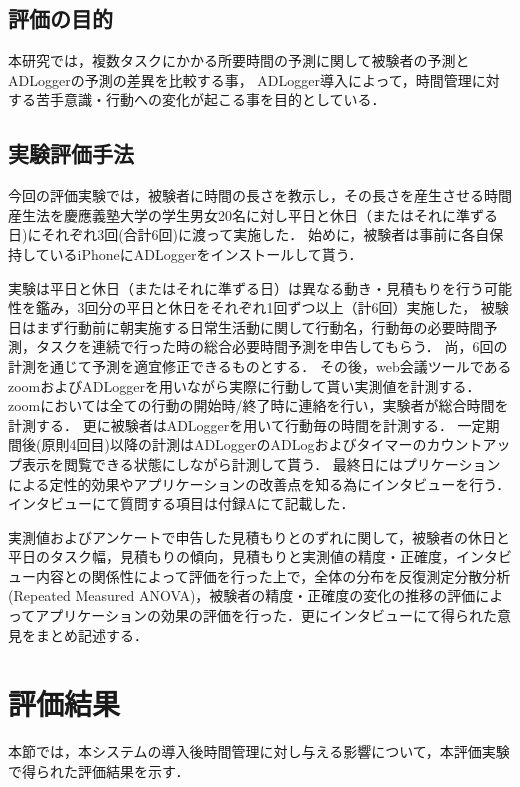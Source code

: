 \subsection{評価の目的}
本研究では，複数タスクにかかる所要時間の予測に関して被験者の予測とADLoggerの予測の差異を比較する事，
ADLogger導入によって，時間管理に対する苦手意識・行動への変化が起こる事を目的としている．

\subsection{実験評価手法}
今回の評価実験では，被験者に時間の長さを教示し，その長さを産生させる時間産生法\cite{Oguro1961}\cite{Tayama2018}を慶應義塾大学の学生男女20名に対し平日と休日（またはそれに準ずる日)にそれぞれ3回(合計6回)に渡って実施した．
始めに，被験者は事前に各自保持しているiPhoneにADLoggerをインストールして貰う．

実験は平日と休日（またはそれに準ずる日）は異なる動き・見積もりを行う可能性を鑑み，3回分の平日と休日をそれぞれ1回ずつ以上（計6回）実施した，
被験日はまず行動前に朝実施する日常生活動に関して行動名，行動毎の必要時間予測，タスクを連続で行った時の総合必要時間予測を申告してもらう．
尚，6回の計測を通じて予測を適宜修正できるものとする．
その後，web会議ツールであるzoom\cite{zoom}およびADLoggerを用いながら実際に行動して貰い実測値を計測する．
zoomにおいては全ての行動の開始時/終了時に連絡を行い，実験者が総合時間を計測する．
更に被験者はADLoggerを用いて行動毎の時間を計測する．
一定期間後(原則4回目)以降の計測はADLoggerのADLogおよびタイマーのカウントアップ表示を閲覧できる状態にしながら計測して貰う．
最終日にはプリケーションによる定性的効果やアプリケーションの改善点を知る為にインタビューを行う．インタビューにて質問する項目は付録Aにて記載した．

実測値およびアンケートで申告した見積もりとのずれに関して，被験者の休日と平日のタスク幅，見積もりの傾向，見積もりと実測値の精度・正確度，インタビュー内容との関係性によって評価を行った上で，全体の分布を反復測定分散分析(Repeated Measured ANOVA)，被験者の精度・正確度の変化の推移の評価によってアプリケーションの効果の評価を行った．更にインタビューにて得られた意見をまとめ記述する．

\section{評価結果}
本節では，本システムの導入後時間管理に対し与える影響について，本評価実験で得られた評価結果を示す．

